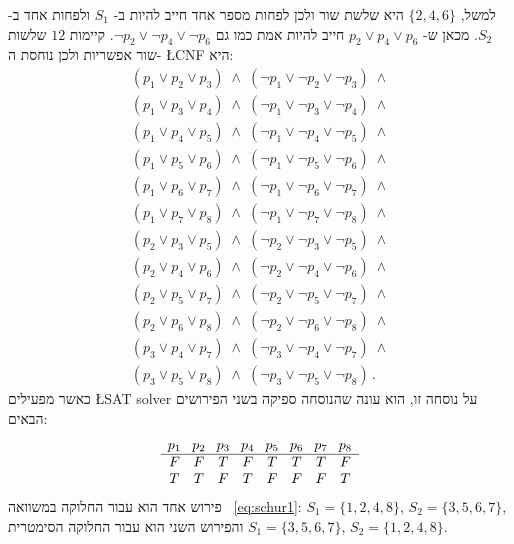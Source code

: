למשל,
$\{2,4,6\}$
היא שלשת שור
ולכן לפחות מספר אחד חייב להיות ב-%
$S_1$
ולפחות אחד ב-%
$S_2$.
מכאן ש-%
$p_2 \vee p_4 \vee p_6$
חייב להיות אמת כמו גם 
$\neg p_2 \vee \neg p_4 \vee \neg p_6$.
קיימות 
$12$
שלשות שור
אפשריות ולכן נוחסת ה-%
\L{CNF}
היא:
\begin{equation}
\begin{array}{l}
(p_1 \vee p_2 \vee p_3) \;\wedge\; (\neg p_1 \vee \neg p_2 \vee \neg p_3) \;\wedge \\
(p_1 \vee p_3 \vee p_4) \;\wedge\; (\neg p_1 \vee \neg p_3 \vee \neg p_4) \;\wedge \\
(p_1 \vee p_4 \vee p_5) \;\wedge\; (\neg p_1 \vee \neg p_4 \vee \neg p_5) \;\wedge \\
(p_1 \vee p_5 \vee p_6) \;\wedge\; (\neg p_1 \vee \neg p_5 \vee \neg p_6) \;\wedge \\
(p_1 \vee p_6 \vee p_7) \;\wedge\; (\neg p_1 \vee \neg p_6 \vee \neg p_7) \;\wedge \\
(p_1 \vee p_7 \vee p_8) \;\wedge\; (\neg p_1 \vee \neg p_7 \vee \neg p_8) \;\wedge \\
(p_2 \vee p_3 \vee p_5) \;\wedge\; (\neg p_2 \vee \neg p_3 \vee \neg p_5) \;\wedge \\
(p_2 \vee p_4 \vee p_6) \;\wedge\; (\neg p_2 \vee \neg p_4 \vee \neg p_6) \;\wedge \\
(p_2 \vee p_5 \vee p_7) \;\wedge\; (\neg p_2 \vee \neg p_5 \vee \neg p_7) \;\wedge \\
(p_2 \vee p_6 \vee p_8) \;\wedge\; (\neg p_2 \vee \neg p_6 \vee \neg p_8) \;\wedge \\
(p_3 \vee p_4 \vee p_7) \;\wedge\; (\neg p_3 \vee \neg p_4 \vee \neg p_7) \;\wedge \\
(p_3 \vee p_5 \vee p_8) \;\wedge\; (\neg p_3 \vee \neg p_5 \vee \neg p_8)\,.
\end{array}\label{eq.schur2}
\end{equation}
כאשר מפעילים 
\L{SAT solver}
על נוסחה זו, הוא עונה שהנוסחה ספיקה בשני הפירושים הבאים:
\[
\begin{array}{c@{\hspace{8pt}}c@{\hspace{8pt}}c@{\hspace{8pt}}c@{\hspace{8pt}}c@{\hspace{8pt}}c@{\hspace{8pt}}c@{\hspace{8pt}}c}
p_1&p_2&p_3&p_4&p_5&p_6&p_7&p_8\\\hline
F&F&T&F&T&T&T&F\\
T&T&F&T&F&F&F&T
\end{array}
\]
פירוש אחד הוא עבור החלוקה במשוואה%
~\ref{eq:schur1}:
$S_1=\{1,2,4,8\}$, $S_2=\{3,5,6,7\}$, 
והפירוש השני הוא עבור החלוקה הסימטרית
 $S_1=\{3,5,6,7\}$, $S_2=\{1,2,4,8\}$.


